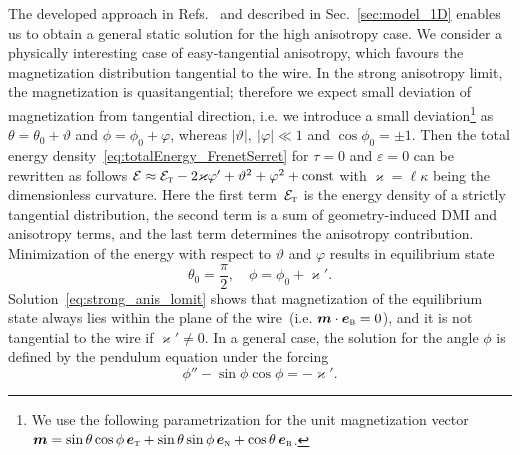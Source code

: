 The developed approach in Refs.~\cite{Sheka15,Volkov18} and described in Sec.~\ref{sec:model_1D} enables us to obtain a general static solution for the high anisotropy case. We consider a physically interesting case of easy-tangential anisotropy, which favours the magnetization distribution tangential to the wire. In the strong anisotropy limit, the magnetization is quasitangential; therefore we expect small deviation of magnetization from tangential direction, i.e. we introduce a small deviation\footnote{We use the following parametrization for the unit magnetization vector $\vec{m}=\sin\theta\cos\phi\,\vec{e}_\textsc{t}+\sin\theta\sin\phi\,\vec{e}_\textsc{n}+\cos\theta\,\vec{e}_\textsc{b}$.} as $\theta=\theta_0+\vartheta$ and $\phi=\phi_0+\varphi$, whereas $|\vartheta|,\ |\varphi|\ll1$ and $\cos\phi_0=\pm1$. Then the total energy density~\eqref{eq:totalEnergy_FrenetSerret} for $\tau=0$ and $\varepsilon = 0$ can be rewritten as follows $\mathcal{E} \approx \mathcal{E}_\textsc{t}-2\varkappa\varphi'+\vartheta^2+\varphi^2+\text{const}$ with $\varkappa=\ell\kappa$ being the dimensionless curvature. Here the first term~$\mathcal{E}_\textsc{t}$ is the energy density of a strictly tangential distribution, the second term is a sum of geometry-induced DMI and anisotropy terms, and the last term determines the anisotropy contribution. Minimization of the energy with respect to $\vartheta$ and $\varphi$ results in equilibrium state
\begin{equation}\label{eq:strong_anis_lomit}
\theta_0=\frac{\pi}{2},\quad \phi=\phi_0+\varkappa'.
\end{equation}
Solution~\eqref{eq:strong_anis_lomit} shows that magnetization of the equilibrium state always lies within the plane of the wire~(i.e. $\vec{m}\cdot\vec{e}_\textsc{b}=0$), and it is not tangential to the wire if $\varkappa'\neq0$. In a general case, the solution for the angle $\phi$ is defined by the pendulum equation under the forcing
\begin{equation}\label{eq:phi_sol}
	\phi'' - \sin\phi\cos\phi = -\varkappa'.
\end{equation}

